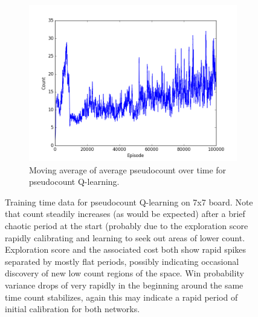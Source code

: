 \documentclass{article}
\begin{document}
\begin{figure}[!ht]
\begin{subfigure}[t]{.45\textwidth}
\end{subfigure}\vfill
\begin{subfigure}[t]{.45\textwidth}
  \centering
      \includegraphics[width=1\textwidth]{pics/7x7_count_count.png}
  \caption{Moving average of average pseudocount over time for pseudocount Q-learning.}
  \label{fig:count_count}
\end{subfigure}\hfill
\caption{Training time data for pseudocount Q-learning on 7x7 board. Note that count steadily increases (as would be expected) after a brief chaotic period at the start (probably due to the exploration score rapidly calibrating and learning to seek out areas of lower count. Exploration score and the associated cost both show rapid spikes separated by mostly flat periods, possibly indicating occasional discovery of new low count regions of the space. Win probability variance drops of very rapidly in the beginning around the same time count stabilizes, again this may indicate a rapid period of initial calibration for both networks.}
\label{fig:count}
\end{figure}
\end{document}
